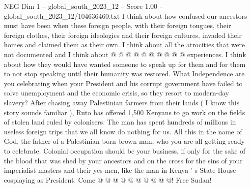 \begin{textsample}{NEG Dim 1 – global\_south\_2023\_12 – Score 1.00 – global\_south\_2023\_12/104636460.txt}
I think about how confused our ancestors must have been when these foreign people, with their foreign tongues, their foreign clothes, their foreign ideologies and their foreign cultures, invaded their homes and claimed them as their own.
I think about all the atrocities that were not documented and I think about @ @ @ @ @ @ @ @ @ @ experiences.
I think about how they would have wanted someone to speak up for them and for them to not stop speaking until their humanity was restored.
What Independence are you celebrating when your President and his corrupt government have failed to solve unemployment and the economic crisis, so they resort to modern-day slavery?
After chasing away Palestinian farmers from their lands ( I know this story sounds familiar ), Ruto has offered 1,500 Kenyans to go work on the fields of stolen land ruled by colonisers.
The man has spent hundreds of millions in useless foreign trips that we all know do nothing for us.
All this in the name of God, the father of a Palestinian-born brown man, who you are all getting ready to celebrate.
Colonial occupation should be your business, if only for the sake of the blood that was shed by your ancestors and on the cross for the sins of your imperialist masters and their yes-men, like the man in Kenya ' s State House cosplaying as President.
Come @ @ @ @ @ @ @ @ @ @!
Free Sudan!

\end{textsample}
